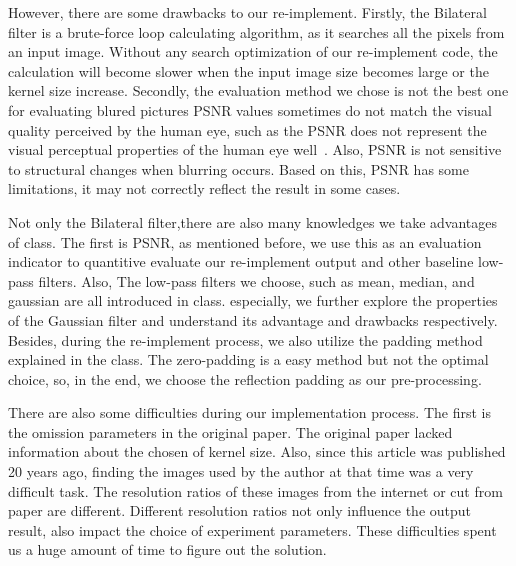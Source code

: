 \documentclass[12pt]{article}
\begin{document}
However, there are some drawbacks to our re-implement. 
Firstly, the Bilateral filter is a brute-force loop calculating algorithm, as it searches all the pixels from an input image.
Without any search optimization of our re-implement code, the calculation will become slower when the input image size becomes large or the kernel size increase.
Secondly, the evaluation method we chose is not the best one for evaluating blured pictures
PSNR values sometimes do not match the visual quality perceived by the human eye, such as the PSNR does not represent the visual perceptual properties of the human eye well~\cite{paper_psnr}.
Also, PSNR is not sensitive to structural changes when blurring occurs.  
Based on this, PSNR has some limitations, it may not correctly reflect the result in some cases.

Not only the Bilateral filter,there are also many knowledges we take advantages of class.
The first is PSNR, as mentioned before, we use this as an evaluation indicator to quantitive evaluate our re-implement output and other baseline low-pass filters.
Also, The low-pass filters we choose, such as mean, median, and gaussian are all introduced in class.
especially, we further explore the properties of the Gaussian filter and understand its advantage and drawbacks respectively.
Besides, during the re-implement process, we also utilize the padding method explained in the class. 
The zero-padding is a easy method but not the optimal choice, so, in the end, we choose the reflection padding as our pre-processing.


There are also some difficulties during our implementation process.
The first is the omission parameters in the original paper.
The original paper lacked information about the chosen of kernel size. 
Also, since this article was published 20 years ago, finding the images used by the author at that time was a very difficult task. 
The resolution ratios of these images from the internet or cut from paper are different.
Different resolution ratios not only influence the output result, also impact the choice of experiment parameters.
These difficulties spent us a huge amount of time to figure out the solution.
\end{document}
